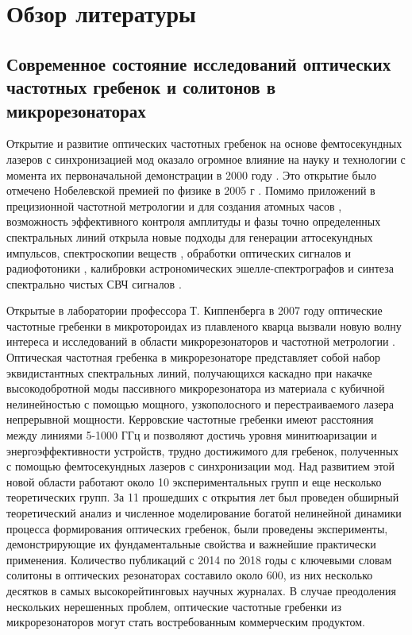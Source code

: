\chapter{Обзор литературы} \label{chapt1}

\section{Современное состояние исследований оптических частотных гребенок и солитонов в микрорезонаторах} \label{sect1_1}

Открытие и развитие оптических частотных гребенок на основе фемтосекундных лазеров с синхронизацией мод оказало огромное влияние на науку и технологии с момента их первоначальной демонстрации в 2000 году \cite{Jones635,PhysRevLett.84.5102}. Это открытие было отмечено Нобелевской премией по физике в 2005 г \cite{Hall2006}. Помимо приложений в прецизионной частотной метрологии и для создания атомных часов \cite{Diddams2001,Udem2002,Ye2005,Diddams2004}, возможность эффективного контроля амплитуды и фазы точно определенных спектральных линий открыла новые подходы для генерации аттосекундных импульсов, спектроскопии веществ \cite{Stowe2008,Diddams2007,Ideguchi2013,Holzwarth2000}, обработки оптических сигналов и радиофотоники \cite{Gao2006,Torres2014}, калибровки астрономических эшелле-спектрографов \cite{Steinmetz2008} и синтеза спектрально чистых СВЧ сигналов \cite{Fortier2011}.

Открытые в лаборатории профессора Т. Киппенберга в 2007 году оптические частотные гребенки в микротороидах из плавленого кварца \cite{DelHaye2007} вызвали новую волну интереса и исследований в области микрорезонаторов и частотной метрологии \cite{Kippenberg2011}. Оптическая частотная гребенка в микрорезонаторе представляет собой набор эквидистантных спектральных линий, получающихся каскадно при накачке высокодобротной моды пассивного микрорезонатора из материала с кубичной нелинейностью с помощью мощного, узкополосного и перестраиваемого лазера непрерывной мощности. Керровские частотные гребенки имеют расстояния между линиями 5-1000 ГГц и позволяют достичь уровня минитюаризации и энергоэффективности устройств, трудно достижимого для гребенок, полученных с помощью фемтосекундных лазеров с синхронизации мод. Над развитием этой новой области работают около 10 экспериментальных групп и еще несколько теоретических групп. За 11 прошедших с открытия лет был проведен обширный теоретический анализ и численное моделирование богатой нелинейной динамики процесса формирования оптических гребенок, были проведены эксперименты, демонстрирующие их фундаментальные свойства и важнейшие практически применения. Количество публикаций с 2014 по 2018 годы с ключевыми словам солитоны в оптических резонаторах составило около 600, из них несколько десятков в самых высокорейтинговых научных журналах. В случае преодоления нескольких нерешенных проблем, оптические частотные гребенки из микрорезонаторов могут стать востребованным коммерческим продуктом.

